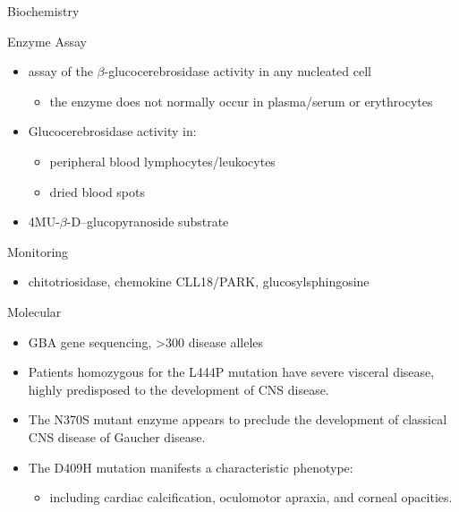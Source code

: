 \documentclass[presentation, smaller]{beamer}
\begin{document}
\begin{frame}[label={sec:orgheadline15}]{Biochemistry}
\begin{block}{Enzyme Assay}
\begin{itemize}
\item assay of the \(\beta\)-glucocerebrosidase activity in any nucleated cell
\begin{itemize}
\item the enzyme does not normally occur in plasma/serum or erythrocytes
\end{itemize}
\item Glucocerebrosidase activity in:
\begin{itemize}
\item peripheral blood lymphocytes/leukocytes
\item dried blood spots
\end{itemize}
\item 4MU-\(\beta\)-D--glucopyranoside substrate
\end{itemize}
\end{block}

\begin{block}{Monitoring}
\begin{itemize}
\item chitotriosidase, chemokine CLL18/PARK, glucosylsphingosine
\end{itemize}
\end{block}
\end{frame}

\begin{frame}[label={sec:orgheadline16}]{Molecular}
\begin{itemize}
\item GBA gene sequencing, >300 disease alleles
\item Patients homozygous for the L444P mutation have severe visceral
disease, highly predisposed to the development of CNS disease.
\item The N370S mutant enzyme appears to preclude the development of classical CNS disease of Gaucher disease.
\item The D409H mutation manifests a characteristic phenotype:
\begin{itemize}
\item including cardiac calcification, oculomotor apraxia, and corneal opacities.
\end{itemize}
\end{itemize}
\end{frame}
\end{document}
